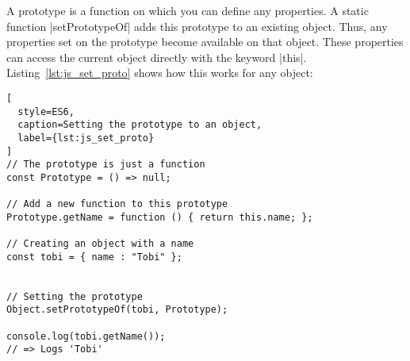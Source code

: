 A prototype is a function on which you can define any properties. A static
function |setPrototypeOf| adds this prototype to an existing object. Thus, any
properties set on the prototype become available on that object. These
properties can access the current object directly with the keyword |this|.
Listing~\ref{lst:js_set_proto} shows how this works for any object:

\begin{lstlisting}[
  style=ES6,
  caption=Setting the prototype to an object,
  label={lst:js_set_proto}
]
// The prototype is just a function
const Prototype = () => null; 

// Add a new function to this prototype
Prototype.getName = function () { return this.name; };

// Creating an object with a name
const tobi = { name : "Tobi" };


// Setting the prototype
Object.setPrototypeOf(tobi, Prototype);

console.log(tobi.getName());
// => Logs 'Tobi' 
\end{lstlisting}


